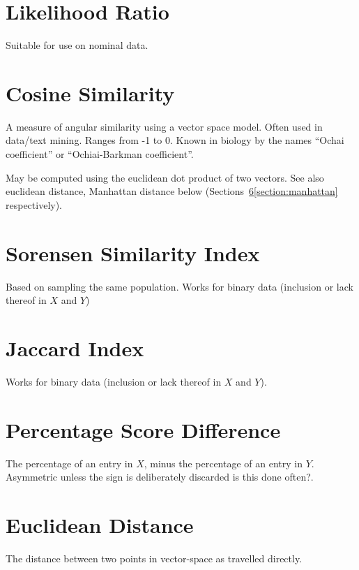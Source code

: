 \documentclass[11pt]{article}
\begin{document}
\section{Likelihood Ratio}
Suitable for use on nominal data.




\section{Cosine Similarity}
A measure of angular similarity using a vector space model.  Often used in data/text mining.  Ranges from -1 to 0.  Known in biology by the names ``Ochai coefficient'' or ``Ochiai-Barkman coefficient''.

May be computed using the euclidean dot product of two vectors.  See also euclidean distance, Manhattan distance below (Sections~\ref{section:euclid}\ref{section:manhattan} respectively).




\section{Sorensen Similarity Index}
Based on sampling the same population.  Works for binary data (inclusion or lack thereof in $X$ and $Y$)



\section{Jaccard Index}
Works for binary data (inclusion or lack thereof in $X$ and $Y$).



\section{Percentage Score Difference}
The percentage of an entry in $X$, minus the percentage of an entry in $Y$.  Asymmetric unless the sign is deliberately discarded {\color{red} is this done often?}.

\section{Euclidean Distance}
\label{section:euclid}
The distance between two points in vector-space as travelled directly.  

\end{document}

